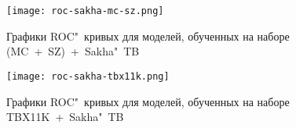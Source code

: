 \begin{figure}[ht]%
	\centering
	\texttt{[image: roc-sakha-mc-sz.png]}
	\caption{Графики ROC"~кривых для моделей, обученных на наборе (MC~+~SZ)~+~Sakha"~TB}\label{fig-roc-mc-sz-sakha}
\end{figure}


\begin{figure}[ht]%
	\centering
	\texttt{[image: roc-sakha-tbx11k.png]}
	\caption{Графики ROC"~кривых для моделей, обученных на наборе TBX11K~+~Sakha"~TB}\label{fig-roc-tbx11k-sakha}
\end{figure}





